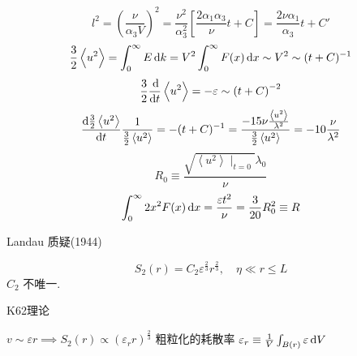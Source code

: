 \documentclass[12pt]{ctexart}
\begin{document}
\begin{equation}
   l^2 = \left( \frac{\nu}{\alpha_3 V} \right) ^2 = \frac{\nu^2}{\alpha_3^2} \left[ \frac{2\alpha_1\alpha_3}{\nu}t + C \right]  = \frac{2\nu \alpha_1}{\alpha_3}t + C'
\end{equation}
\begin{equation}
   \frac{3}{2} \left< u^2 \right> = \int_{0}^{\infty} E \dif k = V^2 \int_{0}^{\infty} F(x) \dif x \sim V^2  \sim (t+C)^{-1}
\end{equation}
\begin{equation}
   \frac{3}{2} \frac{\dif }{\dif t} \left< u^2 \right> = - \varepsilon \sim \left( t + C \right) ^{-2}
\end{equation}
\begin{equation}
   \frac{\dif \frac{3}{2} \left< u^2 \right> }{\dif t} \frac{1}{\frac{3}{2}\left< u^2 \right> } = -(t+C)^{-1} = \frac{-15\nu \frac{\left< u^2 \right> }{\lambda^2}}{\frac{3}{2}\left< u^2 \right> } = -10 \frac{\nu}{\lambda^2}
\end{equation}
\begin{equation}
   R_0 \equiv \frac{\sqrt{\left< u^2 \right> \mid_{t=0}} \lambda_0}{\nu}
\end{equation}
\begin{equation}
   \int_{0}^{\infty} 2 x^2 F(x) \dif x = \frac{\varepsilon t^2}{\nu} = \frac{3}{20} R_0^2 \equiv R 
\end{equation}

Landau 质疑(1944)

\begin{equation}
   S_2 (r) = C_2 \varepsilon^{\frac{2}{3}} r^{\frac{2}{3}}, \quad \eta \ll r \le  L
\end{equation}
$C_2$ 不唯一.

K62理论

$v \sim \varepsilon r \implies S_2(r) \propto (\varepsilon_r r)^{\frac{2}{3}}$ 粗粒化的耗散率 $\varepsilon_r \equiv \frac{1}{V} \int_{B(r)}^{} \varepsilon \dif V $
\end{document}
